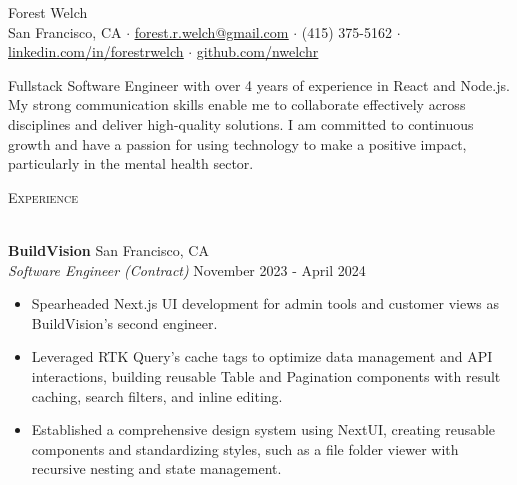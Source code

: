 \documentclass[a4paper]{article}
\newcommand{\header} [1] {
    {\hspace*{-18pt}\vspace*{3pt} \textcolor{deeppurple}{\textsc{#1}}}
    \vspace*{-12pt} \\
    \hspace*{-18pt} \textcolor{deeppurple}{\hrulefill} \\
}
\begin{document}
\vspace{-40pt}

\begin{center}
    {\fontsize{36}{36}\selectfont \textcolor{deeppurple}{Forest Welch}} \\ %
    \vspace{10pt} %
    \small San Francisco, CA $\cdot$ \href{mailto:forest.r.welch@gmail.com}{\underline{forest.r.welch@gmail.com}} $\cdot$ (415) 375-5162 $\cdot$ \href{https://linkedin.com/in/forestrwelch}{\underline{linkedin.com/in/forestrwelch}} $\cdot$ \href{https://github.com/nwelchr}{\underline{github.com/nwelchr}} %
\end{center}

\vspace{10pt}

Fullstack Software Engineer with over 4 years of experience in React and Node.js. My strong communication skills enable me to collaborate effectively across disciplines and deliver high-quality solutions. I am committed to continuous growth and have a passion for using technology to make a positive impact, particularly in the mental health sector.

\header{Experience}
\vspace{1mm}

\textbf{BuildVision} \hfill San Francisco, CA\\
\textit{Software Engineer (Contract)} \hfill November 2023 - April 2024\\
\vspace{-1mm}
\begin{itemize} \itemsep .5pt
    \item Spearheaded Next.js UI development for admin tools and customer views as BuildVision's second engineer.
    \item Leveraged RTK Query's cache tags to optimize data management and API interactions, building reusable Table and Pagination components with result caching, search filters, and inline editing.
    \item Established a comprehensive design system using NextUI, creating reusable components and standardizing styles, such as a file folder viewer with recursive nesting and state management.
\end{itemize}
\end{document}

